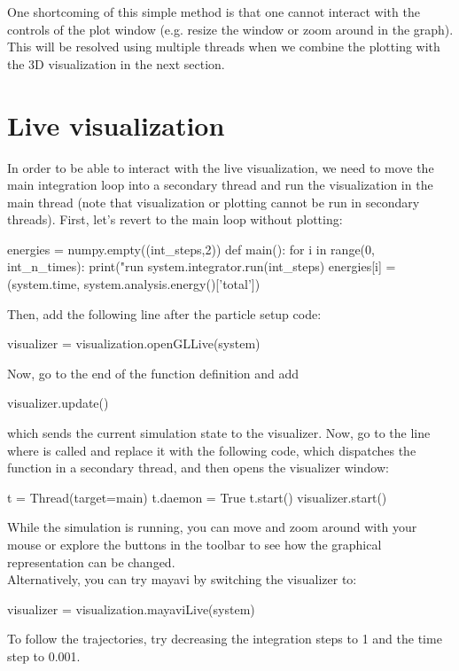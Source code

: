 \documentclass[
paper=a4,                       %
fontsize=11pt,                  %
twoside,                        %
footsepline,                    %
headsepline,                    %
headinclude=false,              %
footinclude=false,              %
pagesize,                       %
]{scrartcl}
\begin{document}
\noindent One shortcoming of this simple method is that one cannot interact with the controls of the plot window (e.g. resize the window or zoom around in the graph).
This will be resolved using multiple threads when we combine the plotting with the 3D visualization in the next section.

\section{Live visualization}
\label{vis}

In order to be able to interact with the live visualization, we need to move the main integration loop into a secondary thread and run the visualization in the main thread (note that visualization or plotting cannot be run in secondary threads). First, let's revert to the main loop without plotting:
\begin{pypresso}
energies = numpy.empty((int_steps,2))
def main():
    for i in range(0, int_n_times):
        print("run %
        system.integrator.run(int_steps)
        energies[i] = (system.time, system.analysis.energy()['total'])
\end{pypresso}

Then, add the following line after the particle setup code:
\begin{pypresso}
visualizer = visualization.openGLLive(system)
\end{pypresso}
Now, go to the end of the  function definition and add
\begin{pypresso}
visualizer.update()
\end{pypresso}
which sends the current simulation state to the visualizer.
Now, go to the line where  is called and replace it with the following code, which dispatches the function in a secondary thread, and then opens the visualizer window:
\begin{pypresso}
t = Thread(target=main)
t.daemon = True
t.start()
visualizer.start()
\end{pypresso}
While the simulation is running, you can move and zoom around with your mouse or explore the buttons in the toolbar to see how the graphical representation can be changed.\\

\noindent Alternatively, you can try mayavi by switching the visualizer to:
\begin{pypresso}
visualizer = visualization.mayaviLive(system)
\end{pypresso}
To follow the trajectories, try decreasing the integration steps to 1 and the time step to 0.001. 
\end{document}
